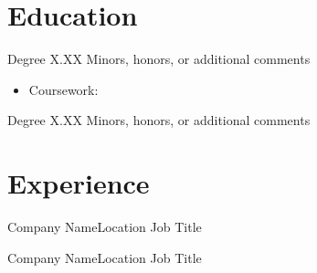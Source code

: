 \documentclass[11pt]{resume}
\begin{document}
\makeheader




\section{Education}

{Degree}
{}
{X.XX}
{Minors, honors, or additional comments}{
    \begin{itemize}
        \item Coursework:
    \end{itemize}
}

{Degree}
{}
{X.XX}
{Minors, honors, or additional comments}{}




\section{Experience}

\begin{experience}{Company Name}{Location}
    {Job Title}
    {}
    \item \lipsum[1][1-2]
    \item \lipsum[1][3-4]
    \item \lipsum[1][5-6]
\end{experience}

\begin{experience}{Company Name}{Location}
    {Job Title}
    {}
    \item \lipsum[1][7-10]
    \item \lipsum[1][11-12]
    \item \lipsum[1][13-15]
\end{experience}
\end{document}
